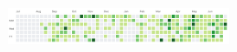 \documentclass[letterpaper]{deedy-resume} %
\begin{document}
\begin{minipage}[t]{0.33\textwidth}
\sectionspace %


\includegraphics[width=2.3in]{github-work}

\section{}
\sectionspace %

\section{}
\sectionspace %

\section{}
\sectionspace %

\section{}
\sectionspace %

\section{}
\sectionspace %

\section{}
\sectionspace %

\section{}
\sectionspace %

\section{}
\sectionspace %

\section{}
\sectionspace %


\end{minipage}
\end{document}
